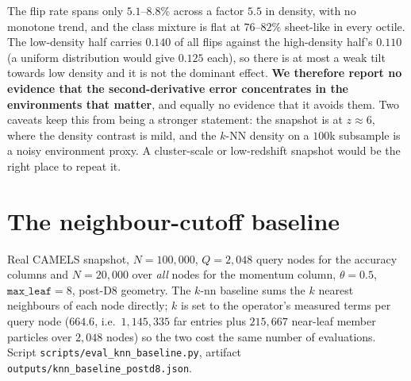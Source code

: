\noindent The flip rate spans only $5.1$--$8.8\%$ across a factor $5.5$ in density, with no monotone
trend, and the class mixture is flat at $76$--$82\%$ sheet-like in every octile. The low-density half
carries $0.140$ of all flips against the high-density half's $0.110$ (a uniform distribution would
give $0.125$ each), so there is at most a weak tilt towards low density and it is not the dominant
effect. \textbf{We therefore report no evidence that the second-derivative error concentrates in the
environments that matter}, and equally no evidence that it avoids them. Two caveats keep this from
being a stronger statement: the snapshot is at $z\approx6$, where the density contrast is mild, and
the $k$-NN density on a $100$k subsample is a noisy environment proxy. A cluster-scale or low-redshift
snapshot would be the right place to repeat it.

\section{The neighbour-cutoff baseline}\label{app:baseline}
Real CAMELS snapshot, $N=100{,}000$, $Q=2{,}048$ query nodes for the accuracy columns and
$N=20{,}000$ over \emph{all} nodes for the momentum column, $\theta=0.5$, $\texttt{max\_leaf}=8$,
post-D8 geometry. The $k$-nn baseline sums the $k$ nearest neighbours of each node directly; $k$ is
set to the operator's measured terms per query node ($664.6$, i.e.\ $1{,}145{,}335$ far entries plus
$215{,}667$ near-leaf member particles over $2{,}048$ nodes) so the two cost the same number of
evaluations. Script \texttt{scripts/\allowbreak eval\_\allowbreak knn\_\allowbreak baseline.\allowbreak py}, artifact
\texttt{outputs/\allowbreak knn\_\allowbreak baseline\_\allowbreak postd8.\allowbreak json}.

\begin{center}
\end{center}

